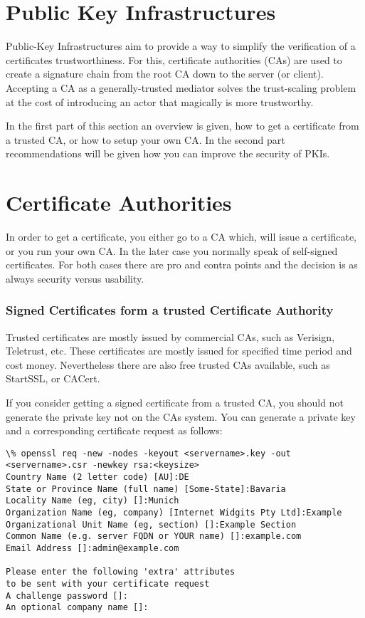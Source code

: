 \section{Public Key Infrastructures}
\label{section:PKIs}

Public-Key Infrastructures aim to provide a way to simplify the verification of
a certificates trustworthiness.  For this, certificate authorities (CAs) are
used to create a signature chain from the root CA down to the server (or client).
Accepting a CA as a generally-trusted mediator solves the trust-scaling problem
at the cost of introducing an actor that magically is more trustworthy.

In the first part of this section an overview is given, how to get a certificate from
a trusted CA, or how to setup your own CA. In the second part recommendations will be 
given how you can improve the security of PKIs.

\section{Certificate Authorities}
\label{sec:cas}
In order to get a certificate, you either go to a CA which, will issue a certificate,
or you run your own CA. In the later case you normally speak of self-signed 
certificates. For both cases there are pro and contra points and the decision is
as always security versus usability.

\subsubsection{Signed Certificates form a trusted Certificate Authority}
\label{sec:signcertfromca}
Trusted certificates are mostly issued by commercial CAs, such as Verisign, Teletrust, etc.
These certificates are mostly issued for specified time period and cost money. Nevertheless
there are also free trusted CAs available, such as StartSSL, or CACert.

If you consider getting a signed certificate from a trusted CA, you should not generate the 
private key not on the CAs system. You can generate a private key and a corresponding 
certificate request as follows:

\begin{lstlisting}[breaklines]
\% openssl req -new -nodes -keyout <servername>.key -out <servername>.csr -newkey rsa:<keysize>
Country Name (2 letter code) [AU]:DE
State or Province Name (full name) [Some-State]:Bavaria
Locality Name (eg, city) []:Munich
Organization Name (eg, company) [Internet Widgits Pty Ltd]:Example
Organizational Unit Name (eg, section) []:Example Section
Common Name (e.g. server FQDN or YOUR name) []:example.com
Email Address []:admin@example.com

Please enter the following 'extra' attributes
to be sent with your certificate request
A challenge password []:
An optional company name []:
\end{lstlisting}

